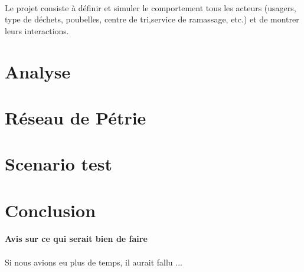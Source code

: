 \documentclass[12pt]{article}
\begin{document}
\paragraph{}Le projet consiste à définir et simuler le comportement tous les acteurs (usagers, type de déchets, poubelles, centre de tri,service de ramassage, etc.) et de montrer leurs interactions.

\section{Analyse}
\paragraph{}


\section{Réseau de Pétrie}

\section{Scenario test}


\section{Conclusion}
\paragraph{Avis sur ce qui serait bien de faire}


\paragraph{}Si nous avions eu plus de temps, il aurait fallu ...
\end{document}
